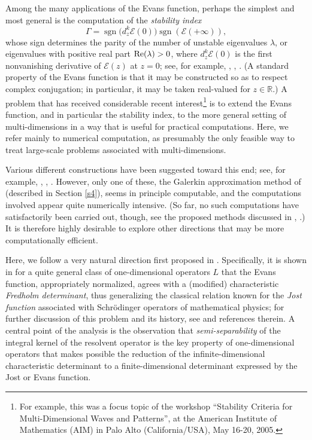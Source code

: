 Among the many applications of the Evans function, perhaps the
simplest and most general is the computation of the {\it stability
index}
\begin{equation}
\Gamma= \operatorname{sgn}\big(d_z^k {{\mathcal E}}(0)\big) \operatorname{sgn} ({{\mathcal E}}(+\infty)),
\end{equation}
whose sign determines the parity of the number of unstable
eigenvalues $\lambda$, or eigenvalues with positive real part
${\text{\rm Re}} (\lambda) >0$, where $d_z^k {{\mathcal E}}(0)$ is the first nonvanishing
derivative of ${{\mathcal E}}(z)$ at $z=0$;
see, for example, \cite{Ev75}, \cite{PW92}, \cite{Zu03}.
(A standard property of the Evans function
is that it may be constructed so as to respect complex conjugation;
in particular, it may be taken real-valued for $z\in {{\mathbb{R}}}$.)
A problem that has received considerable recent interest\footnote{
For example, this was a focus topic of the workshop
``Stability Criteria for Multi-Dimensional
Waves and Patterns'', at the American Institute of
Mathematics (AIM) in Palo Alto (California/USA), May 16-20, 2005.}
is to extend the Evans function, and in particular the stability index,
to the more general setting of multi-dimensions in a way that
is useful for practical computations.
Here, we refer mainly to numerical computation, as presumably the
only feasible way to treat large-scale problems associated
with multi-dimensions.

Various different constructions have been suggested toward this end;
see, for example, \cite{DN06}, \cite{DN08}, \cite{LPSS00}. 
However, only one of these, the Galerkin approximation method
of \cite{LPSS00} (described in Section \ref{s4}), seems in principle computable,
and the computations involved appear quite numerically intensive.
(So far, no such computations have satisfactorily been carried out,
though, see the proposed methods discussed in \cite{HZ06}, \cite{N07}.)
It is therefore highly desirable to explore other directions that
may be more computationally efficient.

Here, we follow a very natural direction first proposed in \cite{GLM07}.
Specifically, it is shown in \cite{GLM07} for a quite
general class of one-dimensional operators $L$ that
the Evans function, appropriately normalized,
agrees with a (modified) characteristic {\it Fredholm determinant}, thus
generalizing the classical relation known for the {\it Jost function} associated
with Schr\"odinger operators of mathematical physics; for further discussion
of this problem and its history, see \cite{GLM07} and references therein.
A central point of the analysis is the observation
\cite{GM04} that {\it semi-separability} of the integral
kernel of the resolvent operator is the key property of
one-dimensional operators that makes possible the reduction of
the infinite-dimensional characteristic determinant to a 
finite-dimensional determinant expressed by the Jost or Evans function.

